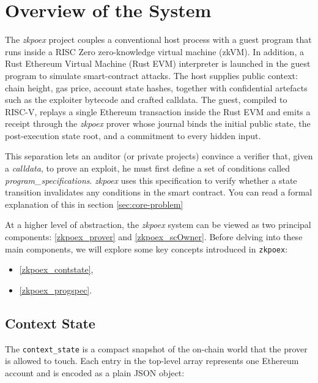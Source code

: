 \section{Overview of the System}
The \textit{zkpoex} project couples a conventional host process with a guest program that runs inside a RISC Zero zero-knowledge virtual machine (zkVM). In addition, a Rust Ethereum Virtual Machine (Rust EVM) interpreter is launched in the guest program to simulate smart-contract attacks.
The host supplies public context: chain height, gas price, account state hashes, together with confidential artefacts such as the exploiter bytecode and crafted calldata.  
The guest, compiled to RISC-V, replays a single Ethereum transaction inside the Rust EVM and emits a receipt through the \textit{zkpoex} prover whose journal binds the initial public state, the post-execution state root, and a commitment to every hidden input.  

This separation lets an auditor (or private projects) convince a verifier that, given a \textit{calldata}, to prove an exploit, he must first define a set of conditions called \textit{program\_specifications}. \textit{zkpoex} uses this specification to verify whether a state transition invalidates any conditions in the smart contract. You can read a formal explanation of this in section \ref{sec:core-problem}

At a higher level of abstraction, the \textit{zkpoex} system can be viewed as two principal components: \ref{zkpoex_prover} and \ref{zkpoex_scOwner}. Before delving into these main components, we will explore some key concepts introduced in \texttt{zkpoex}:

\begin{itemize}
    \item \ref{zkpoex_contstate},
    \item \ref{zkpoex_progspec}.
\end{itemize}

\subsection{Context State}\makeatletter{}\makeatother\label{zkpoex_contstate}

The \texttt{context\_state} is a compact snapshot of the on-chain world that the prover is allowed to touch.  
Each entry in the top-level array represents one Ethereum account and is encoded as a plain JSON object:

